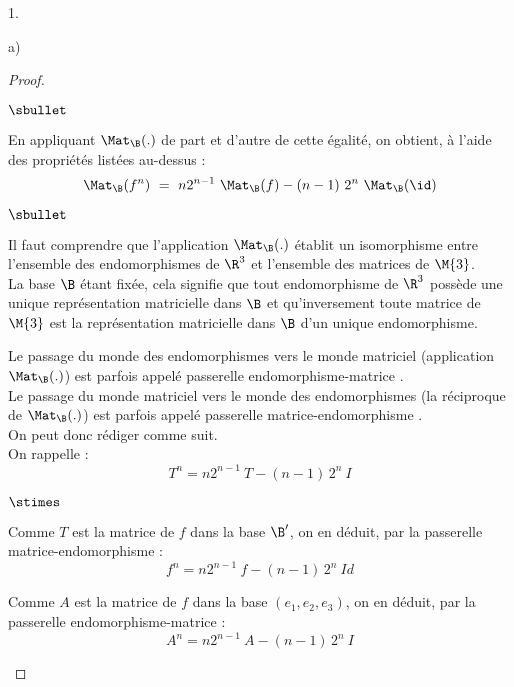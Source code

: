 \begin{noliste}{1.}
\begin{noliste}{a)}
\begin{proof}
\begin{noliste}{$\sbullet$}
      \item En appliquant $\Mat_{\B}(.)$ de part et d'autre de cette
        égalité, on obtient, à l'aide des propriétés listées au-dessus
        :
        \[
        \Mat_{\B}(f^n) \ = \ n2^{n-1} \ \Mat_{\B}(f) - (n-1) \ 2^{n} \
        \Mat_{\B}(\id)
        \]
      \end{noliste}
      \begin{remark}%
        \begin{noliste}{$\sbullet$}
        \item Il faut comprendre que l'application $\Mat_{\B}(.)$
          établit un isomorphisme entre l'ensemble des endomorphismes
          de $\R^3$ et l'ensemble des matrices de $\M{3}$.\\
          La base $\B$ étant fixée, cela signifie que tout
          endomorphisme de $\R^3$ possède une unique représentation
          matricielle dans $\B$ et qu'inversement toute matrice de
          $\M{3}$ est la représentation matricielle dans $\B$ d'un
          unique endomorphisme.
        \item Le passage du monde des endomorphismes vers le monde
          matriciel (application $\Mat_{\B}(.)$) est parfois appelé
          \og passerelle endomorphisme-matrice \fg{}. \\
          Le passage du monde matriciel vers le monde des
          endomorphismes (la réciproque de $\Mat_{\B}(.)$) est parfois
          appelé \og passerelle matrice-endomorphisme \fg{}.\\
          On peut donc rédiger comme suit.\\[.2cm]
          On rappelle :
          \[
          T^n = n 2^{n-1} \ T - (n-1) \, 2^n \ I
          \]
          \begin{noliste}{$\stimes$}
          \item Comme $T$ est la matrice de $f$ dans la base $\B'$, on
            en déduit, par la passerelle matrice-endomorphisme :
            \[
            f^n = n 2^{n-1} \ f - (n-1) \, 2^n \ Id
            \]
          \item Comme $A$ est la matrice de $f$ dans la base $(e_1,
            e_2, e_3)$, on en déduit, par la passerelle
            endomorphisme-matrice : 
            \[
            A^n = n 2^{n-1} \ A - (n-1) \, 2^n \ I
            \]
          \end{noliste}
        \end{noliste}
      \end{remark}

\end{proof}
\end{noliste}
\end{noliste}

